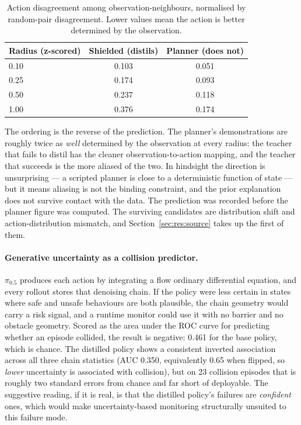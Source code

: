 \documentclass[a4paper,11pt]{report}
\begin{document}
\begin{table}[htbp]
\centering
\caption{Action disagreement among observation-neighbours, normalised by random-pair disagreement.
  Lower values mean the action is better determined by the observation.}
\label{tab:aliasing}
\begin{tabular}{lcc}
\toprule
\textbf{Radius (z-scored)} & \textbf{Shielded (distils)} & \textbf{Planner (does not)} \\
\midrule
0.10 & 0.103 & 0.051 \\
0.25 & 0.174 & 0.093 \\
0.50 & 0.237 & 0.118 \\
1.00 & 0.376 & 0.174 \\
\bottomrule
\end{tabular}
\end{table}

The ordering is the reverse of the prediction. The planner's demonstrations are roughly twice as
\emph{well} determined by the observation at every radius: the teacher that fails to distil has the
cleaner observation-to-action mapping, and the teacher that succeeds is the more aliased of the
two. In hindsight the direction is unsurprising --- a scripted planner is close to a deterministic
function of state --- but it means aliasing is not the binding constraint, and the prior
explanation does not survive contact with the data. The prediction was recorded before the planner
figure was computed. The surviving candidates are distribution shift and action-distribution
mismatch, and Section~\ref{sec:res:source} takes up the first of them.

\paragraph{Generative uncertainty as a collision predictor.}
$\pi_{0.5}$ produces each action by integrating a flow ordinary differential equation, and every
rollout stores that denoising chain. If the policy were less certain in states where safe and
unsafe behaviours are both plausible, the chain geometry would carry a risk signal, and a runtime
monitor could use it with no barrier and no obstacle geometry. Scored as the area under the ROC
curve for predicting whether an episode collided, the result is negative: 0.461 for the base
policy, which is chance. The distilled policy shows a consistent inverted association across all
three chain statistics (AUC 0.350, equivalently 0.65 when flipped, so \emph{lower} uncertainty is
associated with collision), but on 23 collision episodes that is roughly two standard errors from
chance and far short of deployable. The suggestive reading, if it is real, is that the distilled
policy's failures are \emph{confident} ones, which would make uncertainty-based monitoring
structurally unsuited to this failure mode.
\end{document}
